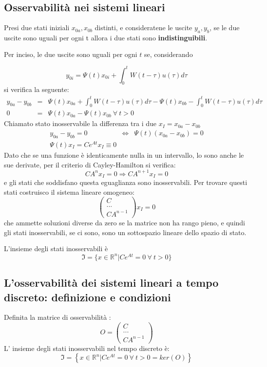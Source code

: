 \documentclass{article}
\begin{document}
\subsection{Osservabilità nei sistemi lineari}
Presi due stati iniziali $x_{0a},x_{0b}$ distinti, e consideratene le uscite $y_a,y_b$, se le due uscite 
sono uguali per ogni t allora i due stati sono \textbf{indistinguibili}.

Per inciso, le due uscite sono uguali per ogni $t$ se,
considerando 

\[ y_{0i} = \Psi(t)x_{0i} + \int_{0}^{t} W(t-\tau) u(\tau) d\tau \]
si verifica la seguente:
\[
    \begin{array}{rcl}
        y_{0a}-y_{0b} & = & \Psi(t)x_{0a} + \int_{0}^{t} W(t-\tau) u(\tau) d\tau - \Psi(t)x_{0b} - \int_{0}^{t} W(t-\tau) u(\tau) d\tau \\
        0 & = & \Psi(t)x_{0a} - \Psi(t)x_{0b} \  \forall\   t>0
    \end{array}    
\]
Chiamato stato inosservabile la differenza tra i due $x_I = x_{0a}-x_{0b}$
\[
    \begin{array}{rcl}
        y_{0a}-y_{0b}  = 0 & \Longleftrightarrow & \Psi(t)(x_{0a} -x_{0b} ) = 0  \\
        \Psi(t)x_I = C e^{At}x_I \equiv 0
    \end{array}    
\]
Dato che se una funzione è identicamente nulla in un intervallo, lo sono anche
le sue derivate, per il criterio di Cayley-Hamilton si verifica:
\[ C A^n x_I = 0 \Longrightarrow C A^{n+1} x_I = 0 \]
e gli stati che soddisfano questa eguaglianza sono inosservabili.
Per trovare questi stati costruisco il sistema lineare omogeneo:
\[\begin{pmatrix}C\\...\\CA^{n-1}\end{pmatrix}x_I = 0\]
che ammette soluzioni diverse da zero se la matrice non ha rango pieno, e quindi gli stati inosservabili,
se ci sono, sono un sottospazio lineare dello spazio di stato.

L'insieme degli stati inosservabili è 
\[\mathfrak{I} = \{ x\in\mathbb{R}^n | Ce^{At}=0\ \forall\ t > 0\}\]



\subsection{L'osservabilità dei sistemi lineari a tempo discreto: definizione e condizioni}
Definita la matrice di osservabilità :
\[O = \begin{pmatrix}C\\...\\CA^{n-1}\end{pmatrix}\]
L' insieme degli stati inosservabili nel tempo discreto è:
\[\mathfrak{I} = \left\{ x\in\mathbb{R}^n | Ce^{At}=0\ \forall\ t > 0 = ker(O)\right\}\]
\end{document}
